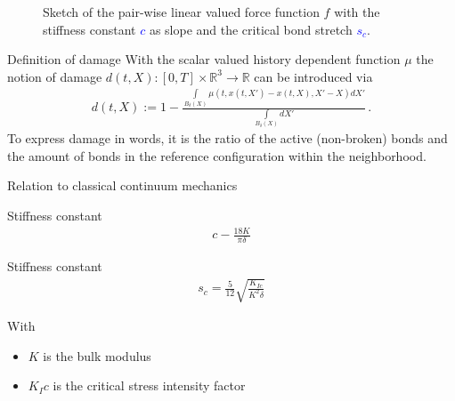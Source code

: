 \documentclass[12pt,t]{beamer}
\newcommand{\R}{\mathbb{R}}
\newcommand{\args}{(t,x(t,X')-x(t,X),X'-X)}
\begin{document}
\begin{frame}{}
\begin{figure}[H]
\caption[Sketch of the pair-wise linear valued force function $f$ with the stiffness constant $c$ as slope and the critical bond stretch $s_c$.]{Sketch of the pair-wise linear valued force function $f$ with the stiffness constant \textcolor{blue}{$c$} as slope and the critical bond stretch \textcolor{blue}{$s_c$}.}
\label{fig::force::sketch::critical}
\end{figure}
\end{frame}

\begin{frame}{Definition of damage}
With the scalar valued history dependent function $\mu$ the notion of damage $d(t,X):[0,T]\times\R^3\rightarrow\R$ can be introduced via
\begin{align*}
d(t,X):= 1- \frac{\displaystyle\int\limits_{B_\delta(X)}\mu\args dX'}{\displaystyle\int\limits_{B_\delta(X)}dX'}\,\text{.}
\label{eq::damage:nodal}
\end{align*}
To express damage in words, it is the ratio of the active (non-broken) bonds and the amount of bonds in the reference configuration within the neighborhood.
\end{frame}



\begin{frame}{Relation to classical continuum mechanics}
\begin{block}{Stiffness constant}
\begin{align*}
c - \frac{18K}{\pi\delta}
\end{align*}
\end{block}
\vspace{-0.25cm}
\begin{block}{Stiffness constant}
\begin{align*}
s_c = \frac{5}{12} \sqrt{\frac{K_{Ic}}{K^2\delta}}
\end{align*}
\end{block}
\vspace{-0.25cm}
With
\begin{itemize}
\item $K$ is the bulk modulus
\item $K_Ic$ is the critical stress intensity factor
\end{itemize}
\end{frame}
\end{document}
